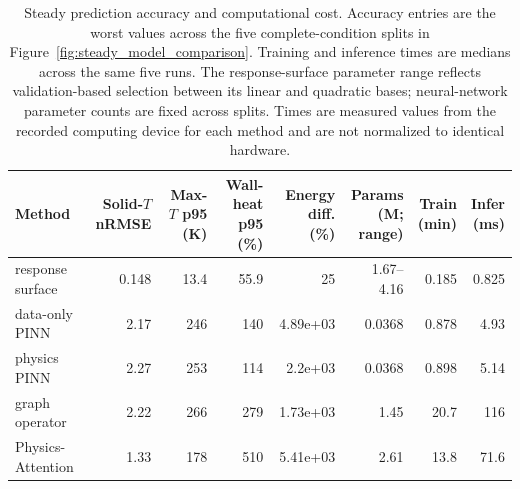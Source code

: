 \begin{table}[htbp]
\centering
\scriptsize
\setlength{\tabcolsep}{1.8pt}
\caption{Steady prediction accuracy and computational cost. Accuracy entries are the worst values across the five complete-condition splits in Figure~\ref{fig:steady_model_comparison}. Training and inference times are medians across the same five runs. The response-surface parameter range reflects validation-based selection between its linear and quadratic bases; neural-network parameter counts are fixed across splits. Times are measured values from the recorded computing device for each method and are not normalized to identical hardware.}
\label{tab:steady_performance}
\begin{tabular*}{\textwidth}{@{\extracolsep{\fill}}lrrrrrrr@{}}
\toprule
Method & \shortstack{Solid-$T$\\nRMSE} & \shortstack{Max-$T$ p95\\(K)} & \shortstack{Wall-heat p95\\(\%)} & \shortstack{Energy diff.\\(\%)} & \shortstack{Params\\(M; range)} & \shortstack{Train\\(min)} & \shortstack{Infer\\(ms)} \\
\midrule
response surface & 0.148 & 13.4 & 55.9 & 25 & 1.67--4.16 & 0.185 & 0.825 \\
data-only PINN & 2.17 & 246 & 140 & 4.89e+03 & 0.0368 & 0.878 & 4.93 \\
physics PINN & 2.27 & 253 & 114 & 2.2e+03 & 0.0368 & 0.898 & 5.14 \\
graph operator & 2.22 & 266 & 279 & 1.73e+03 & 1.45 & 20.7 & 116 \\
Physics-Attention & 1.33 & 178 & 510 & 5.41e+03 & 2.61 & 13.8 & 71.6 \\
\bottomrule
\end{tabular*}
\end{table}
